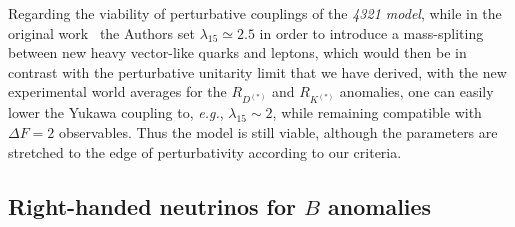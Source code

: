 \documentclass[a4paper,11pt]{article}
\begin{document}
Regarding the viability of perturbative couplings of the {\emph{4321 model}}, while in the original work~\cite{DiLuzio:2018zxy} the Authors set $\lambda_{15}\simeq 2.5 $ in order to introduce a mass-spliting between new heavy vector-like quarks and leptons, which would then be in contrast with the perturbative unitarity limit that we have derived,  with the new experimental world averages for the $R_{D^{(*)}}$ and $R_{K^{(*)}}$ anomalies, one can easily lower  the Yukawa coupling to, {\emph{e.g.}}, $\lambda_{15} \sim 2$, while remaining compatible with $\Delta F=2$ observables.
Thus the model is still viable, although the parameters are stretched to the edge of perturbativity according to our criteria.


\subsection{Right-handed neutrinos for $B$ anomalies}
\end{document}
